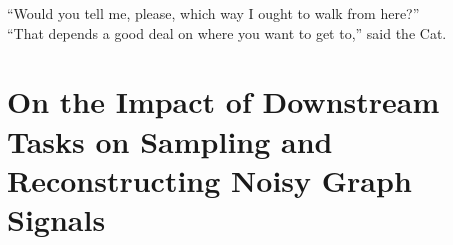 

\begin{savequote}[8cm]
``Would you tell me, please, which way I ought to walk from here?'' \\ 
``That depends a good deal on where you want to get to,''  said the Cat.\\
\end{savequote}
\chapter{\label{ch:proj2}On the Impact of Downstream Tasks on Sampling and Reconstructing Noisy Graph Signals}

